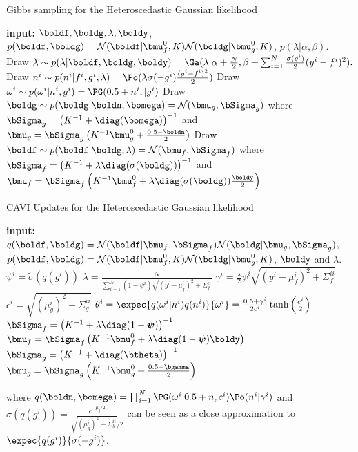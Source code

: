 \begin{algorithm}[H]
    \caption{Gibbs sampling for the Heteroscedastic Gaussian likelihood}
    \begin{algorithmic}
        \State \textbf{input:} $\boldf,\boldg, \lambda, \boldy$, $p(\boldf,\boldg) = \mathcal{N}(\boldf|\bmu^0_f, K)\mathcal{N}(\boldg|\bmu^0_g, K)$, $p(\lambda|\alpha,\beta)$.
            \State Draw $\lambda \sim p(\lambda|\boldf,\boldg,\boldy) = \Ga(\lambda| \alpha + \frac{N}{2}, \beta + \sum_{i=1}^N \frac{\sigma(g^i)}{2}(y^i - f^i)^2).$
            \State Draw $n^i \sim p(n^i|f^i, g^i, \lambda) = \Po(\lambda \sigma(-g^i) \frac{(y^i - f^i)^2}{2})$
            \State Draw $\omega^i \sim p(\omega^i|n^i,g^i) = \PG(0.5 + n^i, |g^i)$
            \State Draw $\boldg \sim p(\boldg|\boldn, \bomega) = \mathcal{N}(\bmu_g,\bSigma_g)$
            \State \quad where $\bSigma_g=  \left(K^{-1} + \diag(\bomega)\right)^{-1}$ and $\bmu_g = \bSigma_g\left(K^{-1}\bmu^0_g + \frac{0.5 - \boldn}{2}\right)$
            \State Draw $\boldf \sim p(\boldf | \boldg, \lambda) = \mathcal{N}(\bmu_f,\bSigma_f)$
            \State \quad where $\bSigma_f = \left(K^{-1} + \lambda\diag(\sigma(\boldg))\right)^{-1}$ and $\bmu_f = \bSigma_f\left(K^{-1}\bmu_f^0 + \lambda\diag(\sigma(\boldg))\frac{\boldy}{2}\right)$
        \EndFor
    \end{algorithmic}
    \label{alg:gibbs_hetero}
\end{algorithm}

\begin{algorithm}[H]
    \caption{\ac{CAVI} Updates for the Heteroscedastic Gaussian likelihood}
    \begin{algorithmic}
        \State \textbf{input:} $q(\boldf,\boldg) = \mathcal{N}(\boldf|\bmu_f,\bSigma_f)\mathcal{N}(\boldg|\bmu_g,\bSigma_g)$, $p(\boldf,\boldg) = \mathcal{N}(\boldf|\bmu^0_f, K)\mathcal{N}(\boldg|\bmu^0_g, K)$, $\boldy$ and $\lambda$.
            \State $\psi^i = \widetilde{\sigma}(q(g^i))$
            \State $\lambda = \frac{N}{\sum_{i=1}^N (1 - \psi^i)\sqrt{(y^i - \mu_f^i)^2 + \Sigma_f^{ii}}}$
            \State $\gamma^i = \frac{\lambda}{2} \psi^i  \sqrt{(y^i - \mu_f^i)^2 + \Sigma_f^{ii}}$
            \State $c^i = \sqrt{(\mu_g^i)^2 + \Sigma^{ii}_g}$
            \State $\theta^i = \expec{q(\omega^i|n^i)q(n^i)}{\omega^i} = \frac{0.5 + \gamma^i}{2c^i}\tanh\left(\frac{c^i}{2}\right)$
            \State $\bSigma_f = \left(K^{-1} + \lambda\diag(1-\boldsymbol{\psi})\right)^{-1}$
            \State $\bmu_f = \bSigma_f\left(K^{-1}\bmu_f^0 + \lambda\diag(1 - \boldsymbol{\psi}) \boldy\right)$
            \State $\bSigma_g = \left(K^{-1} + \diag(\btheta)\right)^{-1}$
            \State $\bmu_g = \bSigma_g\left(K^{-1}\bmu_g^0 + \frac{0.5 + \bgamma}{2}\right)$
        \EndWhile
    \end{algorithmic}
    where $q(\boldn, \bomega) = \prod_{i=1}^N \PG(\omega^i|0.5 + n, c^i)\Po(n^i|\gamma^i)$ and $\widetilde{\sigma}(q(g^i)) = \frac{e^{-\mu_g^i/2}}{\sqrt{(\mu_g^i)^2 + \Sigma^{ii}_k} / 2}$ can be seen as a close approximation to $\expec{q(g^i)}{\sigma(-g^i)}$.
    \label{alg:cavi_hetero}
\end{algorithm}

